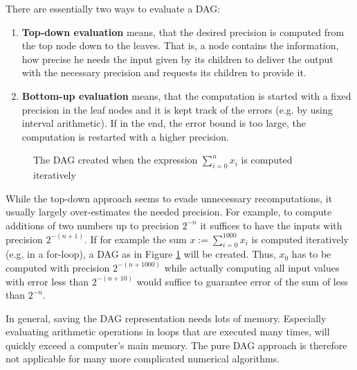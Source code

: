 		There are essentially two ways to evaluate a DAG:
		\begin{enumerate}
			\item \textbf{Top-down evaluation} means, that the desired precision is computed from the top node down to the leaves.
			That is, a node contains the information, how precise he needs the input given by its children to deliver the output with the necessary precision and requests its children to provide it.  
			\item \textbf{Bottom-up evaluation} means, that the computation is started with a fixed precision in the leaf nodes 
			and it is kept track of the errors (e.g. by using interval arithmetic). 
			If in the end, the error bound is too large, the computation is restarted with a higher precision. 
		\end{enumerate}
    \begin{figure}
      \centering
\caption{The DAG created when the expression $\sum_{i=0}^n x_i$ is computed
iteratively}\label{fig:sum dag}
\end{figure}
		While the top-down approach seems to evade unnecessary recomputations, it
    usually largely over-estimates the needed precision.
    For example, to compute additions of two numbers up to precision $2^{-n}$
    it suffices to have the inputs with precision $2^{-(n+1)}$.
    If for example the sum $x := \sum_{i=0}^1000 x_i$ is computed iteratively (e.g. in a
    for-loop), a DAG as in Figure \ref{fig:sum dag} will be created. 
    Thus, $x_0$ has to be computed with precision $2^{-(n+1000)}$ while actually
    computing all input values with error less than $2^{-(n+10)}$ would 
    suffice to guarantee error of the sum of less than $2^{-n}$.

    In general, saving the DAG representation needs lots of memory. 
    Especially evaluating arithmetic operations in loops that are executed many
    times, will quickly exceed a computer's main memory.
    The pure DAG approach is therefore not applicable for many more complicated
    numerical algorithms.
